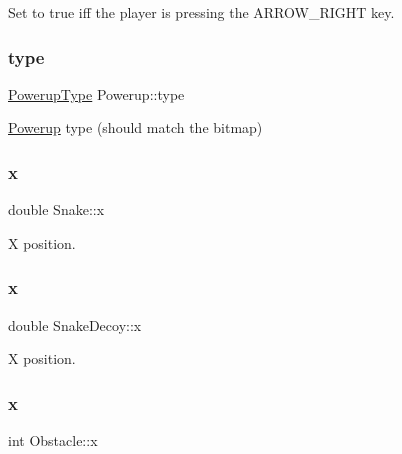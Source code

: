 Set to true iff the player is pressing the A\+R\+R\+O\+W\+\_\+\+R\+I\+G\+HT key. 

\mbox{\label{group__snake_gaddc7f76821bf2505d35b85d3cf725a16}} 
\subsubsection{\texorpdfstring{type}{type}}
{\footnotesize\ttfamily \mbox{\hyperlink{group__snake_gad58f93a5af4c0698fd0b903516c57c31}{Powerup\+Type}} Powerup\+::type}



\mbox{\hyperlink{struct_powerup}{Powerup}} type (should match the bitmap) 

\mbox{\label{group__snake_ga785740f93d9f05bf6821595b78000b64}} 
\subsubsection{\texorpdfstring{x}{x}\hspace{0.1cm}{\footnotesize\ttfamily [1/3]}}
{\footnotesize\ttfamily double Snake\+::x}



X position. 

\mbox{\label{group__snake_ga6245e649ad55ae856c956d31a1a4d2e5}} 
\subsubsection{\texorpdfstring{x}{x}\hspace{0.1cm}{\footnotesize\ttfamily [2/3]}}
{\footnotesize\ttfamily double Snake\+Decoy\+::x}



X position. 

\mbox{\label{group__snake_gaf70994e9c31a4b2fbd941479e13684af}} 
\subsubsection{\texorpdfstring{x}{x}\hspace{0.1cm}{\footnotesize\ttfamily [3/3]}}
{\footnotesize\ttfamily int Obstacle\+::x}

